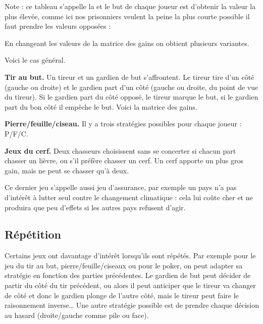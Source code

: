 \documentclass[11pt,class=report,crop=false]{standalone}
\begin{document}
Note : ce tableau s'appelle la  et le but de chaque joueur est d'obtenir la valeur la plus élevée, comme ici nos prisonniers veulent la peine la plus courte possible il faut prendre les valeurs opposées :


En changeant les valeurs de la matrice des gains on obtient plusieurs variantes.

Voici le cas général.



\textbf{Tir au but.} 
Un tireur et un gardien de but s'affrontent. Le tireur tire d'un côté (gauche ou droite) et le gardien part d'un côté (gauche ou droite, du point de vue du tireur). Si le gardien part du côté opposé, le tireur marque le but, si le gardien part du bon côté il empêche le but.
Voici la matrice des gains.




\textbf{Pierre/feuille/ciseau.}
Il y a trois stratégies possibles pour chaque joueur : P/F/C.





\textbf{Jeux du cerf.} 
Deux chasseurs choisissent sans se concerter si chacun part chasser un lièvre, ou s'il préfère chasser un cerf. Un cerf apporte un plus gros gain, mais ne peut se chasser qu'à deux.




Ce dernier jeu s'appelle aussi jeu d'assurance, par exemple un pays n'a pas d'intérêt à lutter seul contre le changement climatique : cela lui coûte cher et ne produira que peu d'effets si les autres pays refusent d'agir.


\subsection{Répétition}

Certains jeux ont davantage d'intérêt lorsqu'ils sont répétés. Par exemple pour le jeu du tir au but, \og{}pierre/feuille/ciseaux\fg{} ou pour le poker, on peut adapter sa stratégie en fonction des parties précédentes. Le gardien de but peut décider de partir du côté du tir précédent, ou alors il peut anticiper que le tireur va changer de côté et donc le gardien plonge de l'autre côté, mais le tireur peut faire le raisonnement inverse\ldots{} Une autre stratégie possible est de prendre chaque décision au hasard (droite/gauche comme pile ou face).
\end{document}
